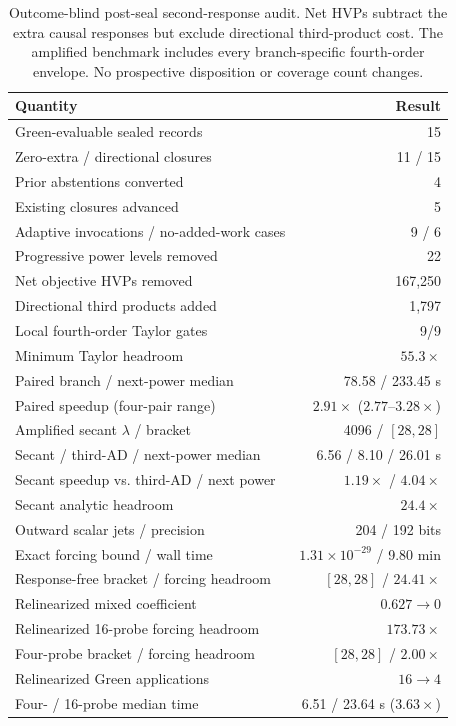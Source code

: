 \documentclass{article}
\begin{document}
\begin{table}[H]
\caption{Outcome-blind post-seal second-response audit.  Net HVPs subtract the
extra causal responses but exclude directional third-product cost.  The
amplified benchmark includes every branch-specific fourth-order envelope.  No
prospective disposition or coverage count changes.}
\label{tab:two-response-audit}
\centering
\small
\setlength{\tabcolsep}{8pt}
\begin{tabular}{lr}
\toprule
Quantity & Result \\
\midrule
Green-evaluable sealed records & 15 \\
Zero-extra / directional closures & 11 / 15 \\
Prior abstentions converted & 4 \\
Existing closures advanced & 5 \\
Adaptive invocations / no-added-work cases & 9 / 6 \\
Progressive power levels removed & 22 \\
Net objective HVPs removed & 167,250 \\
Directional third products added & 1,797 \\
Local fourth-order Taylor gates & 9/9 \\
Minimum Taylor headroom & $55.3\times$ \\
Paired branch / next-power median & 78.58 / 233.45 s \\
Paired speedup (four-pair range) & $2.91\times$ ($2.77$--$3.28\times$) \\
Amplified secant $\lambda$ / bracket & 4096 / $[28,28]$ \\
Secant / third-AD / next-power median & 6.56 / 8.10 / 26.01 s \\
Secant speedup vs. third-AD / next power & $1.19\times$ / $4.04\times$ \\
Secant analytic headroom & $24.4\times$ \\
Outward scalar jets / precision & 204 / 192 bits \\
Exact forcing bound / wall time & $1.31\times10^{-29}$ / 9.80 min \\
Response-free bracket / forcing headroom & $[28,28]$ / $24.41\times$ \\
Relinearized mixed coefficient & $0.627\to0$ \\
Relinearized 16-probe forcing headroom & $173.73\times$ \\
Four-probe bracket / forcing headroom & $[28,28]$ / $2.00\times$ \\
Relinearized Green applications & $16\to4$ \\
Four- / 16-probe median time & 6.51 / 23.64 s ($3.63\times$) \\
\bottomrule
\end{tabular}
\end{table}
\end{document}
